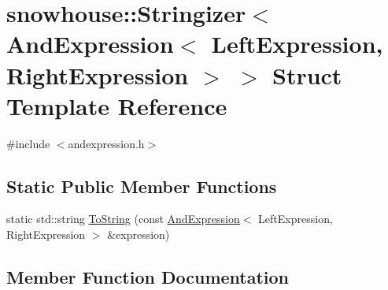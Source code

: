 \hypertarget{structsnowhouse_1_1Stringizer_3_01AndExpression_3_01LeftExpression_00_01RightExpression_01_4_01_4}{}\section{snowhouse\+::Stringizer$<$ And\+Expression$<$ Left\+Expression, Right\+Expression $>$ $>$ Struct Template Reference}
\label{structsnowhouse_1_1Stringizer_3_01AndExpression_3_01LeftExpression_00_01RightExpression_01_4_01_4}


{\ttfamily \#include $<$andexpression.\+h$>$}

\subsection*{Static Public Member Functions}
\begin{DoxyCompactItemize}
\item 
static std\+::string \mbox{\hyperlink{structsnowhouse_1_1Stringizer_3_01AndExpression_3_01LeftExpression_00_01RightExpression_01_4_01_4_a9175b8a0134807d4113b2169478915c4}{To\+String}} (const \mbox{\hyperlink{structsnowhouse_1_1AndExpression}{And\+Expression}}$<$ Left\+Expression, Right\+Expression $>$ \&expression)
\end{DoxyCompactItemize}


\subsection{Member Function Documentation}
\mbox{\label{structsnowhouse_1_1Stringizer_3_01AndExpression_3_01LeftExpression_00_01RightExpression_01_4_01_4_a9175b8a0134807d4113b2169478915c4}} 
